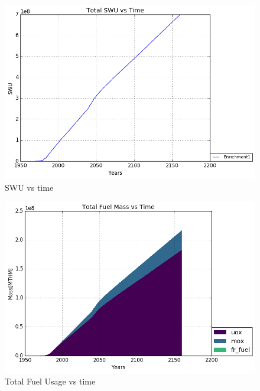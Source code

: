 \begin{figure}
	\includegraphics[width=\linewidth]{./images/stoprep_2020/Enrichment1_SWU.png}
	\caption{SWU vs time}
	\label{fig:reprocess_swu}
\end{figure}

\begin{figure}
	\includegraphics[width=\linewidth]{./images/stoprep_2020/total_fuel.png}
	\caption{Total Fuel Usage vs time}
	\label{fig:reprocess_fuel}
\end{figure}


